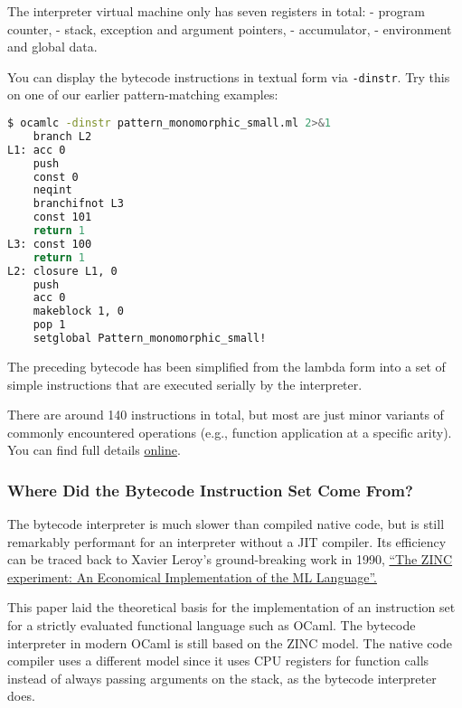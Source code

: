 The interpreter virtual machine only has seven registers in total: -
program counter, - stack, exception and argument pointers, -
accumulator, - environment and global data.

You can display the bytecode instructions in textual form via
\passthrough{\lstinline!-dinstr!}. Try this on one of our earlier
pattern-matching examples:

\begin{lstlisting}[language=bash]
$ ocamlc -dinstr pattern_monomorphic_small.ml 2>&1
    branch L2
L1: acc 0
    push
    const 0
    neqint
    branchifnot L3
    const 101
    return 1
L3: const 100
    return 1
L2: closure L1, 0
    push
    acc 0
    makeblock 1, 0
    pop 1
    setglobal Pattern_monomorphic_small!
\end{lstlisting}

The preceding bytecode has been simplified from the lambda form into a
set of simple instructions that are executed serially by the
interpreter.

There are around 140 instructions in total, but most are just minor
variants of commonly encountered operations (e.g., function application
at a specific arity). You can find full details
\href{http://cadmium.x9c.fr/distrib/caml-instructions.pdf}{online}.

\hypertarget{where-did-the-bytecode-instruction-set-come-from}{%
\subsubsection{Where Did the Bytecode Instruction Set Come
From?}\label{where-did-the-bytecode-instruction-set-come-from}}

The bytecode interpreter is much slower than compiled native code, but
is still remarkably performant for an interpreter without a JIT
compiler. Its efficiency can be traced back to Xavier Leroy's
ground-breaking work in 1990,
\href{http://hal.inria.fr/docs/00/07/00/49/PS/RT-0117.ps}{``The ZINC
experiment: An Economical Implementation of the ML Language''.}

This paper laid the theoretical basis for the implementation of an
instruction set for a strictly evaluated functional language such as
OCaml. The bytecode interpreter in modern OCaml is still based on the
ZINC model. The native code compiler uses a different model since it
uses CPU registers for function calls instead of always passing
arguments on the stack, as the bytecode interpreter does.

